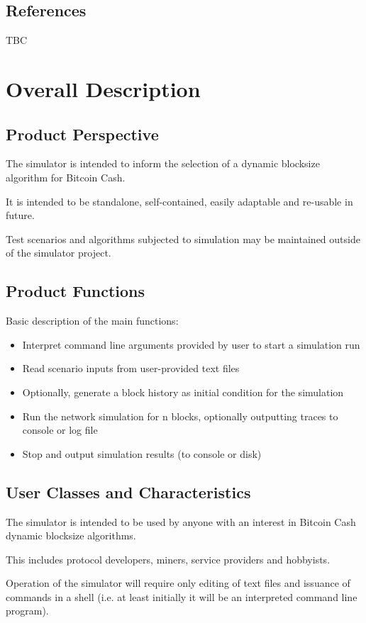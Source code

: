 \documentclass{scrreprt}
\begin{document}
\section{References}
TBC


\chapter{Overall Description}


\section{Product Perspective}
The simulator is intended to inform the selection of a dynamic blocksize algorithm
for Bitcoin Cash.

It is intended to be standalone, self-contained, easily adaptable and
re-usable in future.

Test scenarios and algorithms subjected to simulation may be maintained
outside of the simulator project.


\section{Product Functions}
Basic description of the main functions:
\begin{itemize}
\item Interpret command line arguments provided by user to start a simulation run
\item Read scenario inputs from user-provided text files
\item Optionally, generate a block history as initial condition for the simulation
\item Run the network simulation for n blocks, optionally outputting traces to console or log file
\item Stop and output simulation results (to console or disk)
\end{itemize}



\section{User Classes and Characteristics}
The simulator is intended to be used by anyone with an interest in Bitcoin Cash
dynamic blocksize algorithms.

This includes protocol developers, miners, service providers and hobbyists.

Operation of the simulator will require only editing of text files and issuance of
commands in a shell (i.e. at least initially it will be an interpreted command line
program).
\end{document}
